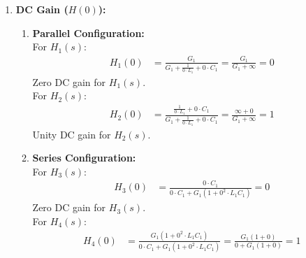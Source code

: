 \begin{enumerate}
\begin{enumerate}
        For \(H_3(s)\):
          \begin{align*}
            sC_1 &= 0 \\
            s &= 0
          \end{align*}
          Zero at origin for \(H_3(s)\). \\
        For \(H_4(s)\):
          \begin{align*}
            G_1(1 + s^2 L_1 C_1) &= 0 \\
            1 + s^2 L_1 C_1 &= 0 \\
            s^2 + \frac{1}{L_1 C_1} &= 0 \\
            s &= \pm j\sqrt{\frac{1}{L_1 C_1}} \quad \text{[let \(s = s_z\)]} \\
            \boxed{f_z = \frac{|s_z|}{2\pi} = \frac{\sqrt{\frac{1}{L_1 C_1}}}{2\pi} = \frac{1}{2\pi \sqrt{L_1 C_1}}}
          \end{align*}
         Zero at natural frequency for \(H_4(s)\).
    \end{enumerate}
  \item \textbf{DC Gain (\(H(0)\)):} \\
    \begin{enumerate}
    \item \textbf{Parallel Configuration:}\\
        For \(H_1(s)\):
        \begin{align*}
          H_1(0) &= \frac{G_1}{G_1 + \frac{1}{0 \cdot L_1} + 0 \cdot C_1} = \frac{G_1}{G_1 + \infty} = 0
        \end{align*}
        Zero DC gain for \(H_1(s)\). \\
        For \(H_2(s)\):
        \begin{align*}
          H_2(0) &= \frac{\frac{1}{0 \cdot L_1} + 0 \cdot C_1}{G_1 + \frac{1}{0 \cdot L_1} + 0 \cdot C_1} = \frac{\infty + 0}{G_1 + \infty} = 1
        \end{align*}
        Unity DC gain for \(H_2(s)\).
      \item \textbf{Series Configuration:}\\
        For \(H_3(s)\):
        \begin{align*}
          H_3(0) &= \frac{0 \cdot C_1}{0 \cdot C_1 + G_1(1 + 0^2 \cdot L_1 C_1)} = 0
        \end{align*}
        Zero DC gain for \(H_3(s)\). \\
        For \(H_4(s)\):
        \begin{align*}
          H_4(0) &= \frac{G_1(1 + 0^2 \cdot L_1 C_1)}{0 \cdot C_1 + G_1(1 + 0^2 \cdot L_1 C_1)} = \frac{G_1(1 + 0)}{0 + G_1(1 + 0)} = 1 \\

\end{align*}
\end{enumerate}
\end{enumerate}
